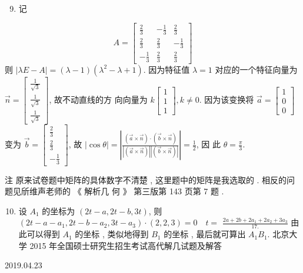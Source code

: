 \documentclass[10pt]{article}
\begin{document}
\begin{enumerate}
  \setcounter{enumi}{8}
  \item  记 
\end{enumerate}
$$
A=\left[\begin{array}{rrr}
\frac{2}{3} & -\frac{1}{3} & \frac{2}{3} \\
\frac{2}{3} & \frac{2}{3} & -\frac{1}{3} \\
-\frac{1}{3} & \frac{2}{3} & \frac{2}{3}
\end{array}\right]
$$
 则  $|\lambda E-A|=(\lambda-1)\left(\lambda^{2}-\lambda+1\right)$.  因为特征值  $\lambda=1$  对应的一个特征向量为  $\vec{n}=\left[\begin{array}{c}\frac{1}{\sqrt{3}} \\ \frac{1}{\sqrt{3}} \\ \frac{1}{\sqrt{3}}\end{array}\right]$,  故不动直线的方   向向量为  $k\left[\begin{array}{l}1 \\ 1 \\ 1\end{array}\right], k \neq 0$.  因为该变换将  $\vec{a}=\left[\begin{array}{l}1 \\ 0 \\ 0\end{array}\right]$  变为  $\vec{b}=\left[\begin{array}{r}\frac{2}{3} \\ \frac{2}{3} \\ -\frac{1}{3}\end{array}\right]$,  故  $|\cos \theta|=\left|\frac{(\vec{a} \times \vec{n}) \cdot(\vec{b} \times \vec{n})}{|(\vec{a} \times \vec{n})||(\vec{b} \times \vec{n})|}\right|=\frac{1}{2}$,  因   此  $\theta=\frac{\pi}{3}$.

 注   原来试卷题中矩阵的具体数字不清楚 ,  这里题中的矩阵是我选取的 .  相反的问题见斦维声老师的 《 解析几   何 》 第三版第  143  页第  7  题 .

\begin{enumerate}
  \setcounter{enumi}{9}
  \item  设  $A_{1}$  的坐标为  $(2 t-a, 2 t-b, 3 t)$,  则  $\left(2 t-a-a_{1}, 2 t-b-a_{2}, 3 t-a_{3}\right) \cdot(2,2,3)=0 \quad t=$ $\frac{2 a+2 b+2 a_{1}+2 a_{2}+3 a_{3}}{17 .}$  由此可以得到  $A_{1}$  的坐标 ,  类似地得到  $B_{1}$  的坐标 ,  最后就可算出  $A_{1} B_{1}$.  北京大学  2015  年全国硕士研究生招生考试高代解几试题及解答     
\end{enumerate}
2019.04.23
\end{document}
